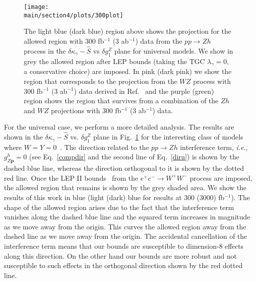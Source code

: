 \begin{figure}[!t]\centering
\texttt{[image: \\main/section4/plots/300plot]}
\caption{The light blue (dark blue) region above shows the projection for the allowed region with 300 fb$^{-1}$ (3 ab$^{-1}$) data from the 
$pp \to Zh$ process  in the $\delta \kappa_\gamma-\hat{S}$ vs $\delta g^Z_1$ plane for universal models. We show in grey the allowed region after LEP bounds (taking the TGC $\lambda_\gamma=0$, a conservative choice) are imposed.  In pink (dark pink)  we show the region that corresponds to the projection from the $WZ$ process  with 300 fb$^{-1}$ (3 ab$^{-1}$) data derived in Ref.~\cite{Franceschini:2017xkh} and the purple (green) region shows the region that survives from a combination of the $Zh$ and $WZ$ projections with 300 fb$^{-1}$ (3 ab$^{-1}$) data.}\label{bounds}
\end{figure} 

For the universal case, we perform a more detailed analysis. The results are shown in the 
$\delta \kappa_\gamma-\hat{S}$ vs. $\delta g^Z_1$ plane  in Fig.~\ref{bounds} for the interesting class of models where $W=Y=0$~\cite{Franceschini:2017xkh}. The  
direction related to the $pp \to Zh$ interference term, \textit{i.e.}, $g^h_{Z\textbf{p}}=0$ (see Eq.~\ref{compdir} and the second line of Eq.~\ref{diru}) is shown by the dashed blue line, whereas the direction orthogonal to it is shown by the dotted red line.  Once the LEP II bounds~\cite{LEP2} from the $e^+e^- \to W^+W^-$ 
process are imposed, the allowed region that remains is shown by the grey shaded area. We show the results of this work  in blue (light (dark) blue for results at
300 (3000) fb$^{-1}$).  The shape of the allowed region arises due to the fact that the interference term vanishes along the dashed blue line and the squared term increases in magnitude as we move away from the origin. This curves the allowed region away from the dashed line as we move away from the origin.  The accidental cancellation of the interference term means that our bounds are susceptible to dimension-8 effects along this direction. On the other hand our bounds are more robust and not susceptible to such effects in the orthogonal direction shown by the red dotted line.

